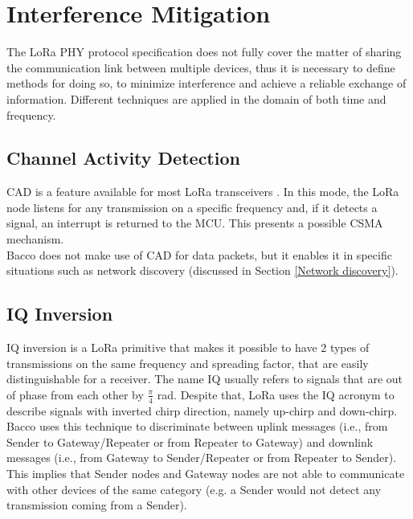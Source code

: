 \section{Interference Mitigation}
The LoRa PHY protocol specification does not fully cover the matter of sharing the communication link between multiple
devices, thus it is necessary to define methods for doing so, to minimize interference and achieve
a reliable exchange of information. Different techniques are applied in the domain of both time and frequency.

\subsection{Channel Activity Detection}
\Gls{CAD} is a feature available for most LoRa transceivers \cite{cad}. In this mode, the LoRa node
listens for any transmission on a specific frequency and, if it detects a signal, an interrupt is returned to the
\gls{MCU}. This
presents a possible \gls{CSMA} mechanism.\\
Bacco does not make use of \gls{CAD} for data packets, but it enables it in specific situations such as network discovery (discussed
in Section \ref{Network discovery}).

\subsection{IQ Inversion}
\Gls{IQ} inversion is a LoRa primitive that makes it possible to have 2 types of transmissions on the same frequency and
spreading factor, that are easily distinguishable for a receiver. The name \gls{IQ} usually refers to
signals that are out of phase from each other by $\frac{\pi}{4}$ rad. Despite that, LoRa uses the \gls{IQ} acronym to describe
signals with inverted chirp direction, namely up-chirp and down-chirp.\\
Bacco uses this technique to discriminate between uplink messages (i.e., from Sender to
Gateway/Repeater or from Repeater to Gateway) and downlink messages (i.e., from Gateway to Sender/Repeater or from
Repeater to Sender). This implies that Sender nodes and Gateway nodes are not able to communicate with other devices of
the same category (e.g. a Sender would not detect any transmission coming from a Sender).


